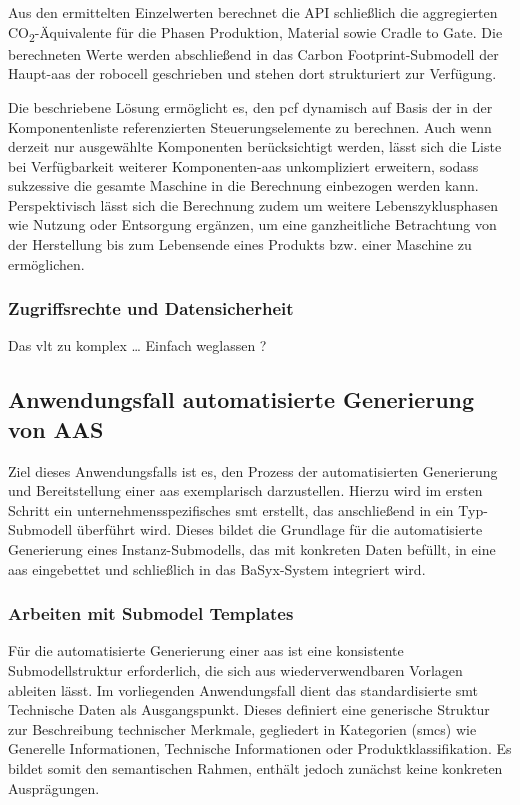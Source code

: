 Aus den ermittelten Einzelwerten berechnet die API schließlich die aggregierten CO\textsubscript{2}-Äquivalente für die Phasen Produktion, Material sowie Cradle to Gate. 
Die berechneten Werte werden abschließend in das Carbon Footprint-Submodell der Haupt-\acs{aas} der robocell geschrieben und stehen dort strukturiert zur Verfügung.

Die beschriebene Lösung ermöglicht es, den \acs{pcf} dynamisch auf Basis der in der Komponentenliste referenzierten Steuerungselemente zu berechnen. 
Auch wenn derzeit nur ausgewählte Komponenten berücksichtigt werden, lässt sich die Liste bei Verfügbarkeit weiterer Komponenten-\acs{aas} unkompliziert erweitern, sodass sukzessive die gesamte Maschine in die Berechnung einbezogen werden kann. 
Perspektivisch lässt sich die Berechnung zudem um weitere Lebenszyklusphasen wie Nutzung oder Entsorgung ergänzen, um eine ganzheitliche Betrachtung von der Herstellung bis zum Lebensende eines Produkts bzw. einer Maschine zu ermöglichen.

\subsubsection{Zugriffsrechte und Datensicherheit}
Das vlt zu komplex \dots
Einfach weglassen ? 


\newpage
\subsection{Anwendungsfall automatisierte Generierung von AAS}
Ziel dieses Anwendungsfalls ist es, den Prozess der automatisierten Generierung und Bereitstellung einer \acs{aas} exemplarisch darzustellen. 
Hierzu wird im ersten Schritt ein unternehmensspezifisches \acs{smt} erstellt, das anschließend in ein Typ-Submodell überführt wird.
Dieses bildet die Grundlage für die automatisierte Generierung eines Instanz-Submodells, das mit konkreten Daten befüllt, in eine \acs{aas} eingebettet und schließlich in das BaSyx-System integriert wird.

\subsubsection{Arbeiten mit Submodel Templates}
\label{chap:ErstellenvonSubmodelTemplates}
Für die automatisierte Generierung einer \acs{aas} ist eine konsistente Submodellstruktur erforderlich, die sich aus wiederverwendbaren Vorlagen ableiten lässt.
Im vorliegenden Anwendungsfall dient das standardisierte \acs{smt} Technische Daten \cite{SpezifikaitonTechnischeDaten} als Ausgangspunkt. 
Dieses definiert eine generische Struktur zur Beschreibung technischer Merkmale, gegliedert in Kategorien (\acsp{smc}) wie Generelle Informationen, Technische Informationen oder Produktklassifikation. 
Es bildet somit den semantischen Rahmen, enthält jedoch zunächst keine konkreten Ausprägungen.

